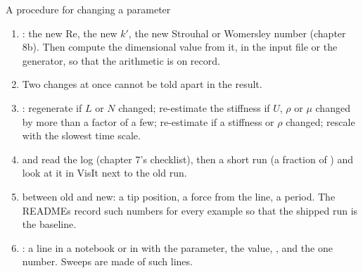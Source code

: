 \documentclass[aspectratio=169,11pt]{beamer}
\begin{document}
\begin{frame}{A procedure for changing a parameter}
\label{fr:procedure}
\small
\begin{enumerate}
  \item {}: the new $\mathrm{Re}$, the new $k'$, the new Strouhal or Womersley number (chapter 8b). Then compute the dimensional value from it, in the input file or the generator, so that the arithmetic is on record.
  \item {} Two changes at once cannot be told apart in the result.
  \item {}: regenerate if $L$ or $N$ changed; re-estimate the stiffness if $U$, $\rho$ or $\mu$ changed by more than a factor of a few; re-estimate  if a stiffness or $\rho$ changed; rescale  with the slowest time scale.
  \item {} and read the log (chapter 7's checklist), then a short run (a fraction of ) and look at it in VisIt next to the old run.
  \item {} between old and new: a tip position, a force from the  line, a period. The READMEs record such numbers for every example so that the shipped run is the baseline.
  \item {}: a line in a notebook or in  with the parameter, the value, , and the one number. Sweeps are made of such lines.
\end{enumerate}
\end{frame}
\end{document}
